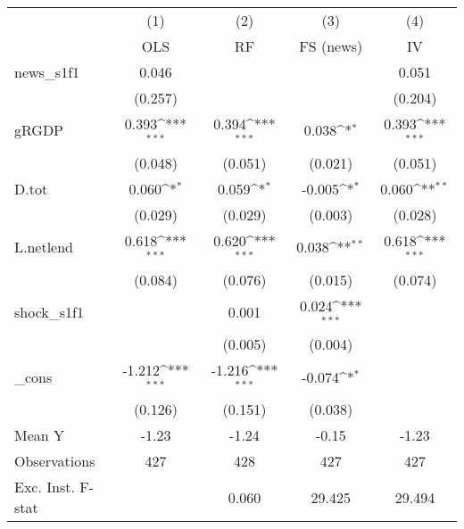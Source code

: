 {
\def\sym#1{\ifmmode^{#1}\else\(^{#1}\)\fi}
\begin{tabular}{l*{4}{c}}
\toprule
            &\multicolumn{1}{c}{(1)}&\multicolumn{1}{c}{(2)}&\multicolumn{1}{c}{(3)}&\multicolumn{1}{c}{(4)}\\
            &\multicolumn{1}{c}{OLS}&\multicolumn{1}{c}{RF}&\multicolumn{1}{c}{FS (news)}&\multicolumn{1}{c}{IV}\\
\midrule
news\_s1f1   &       0.046         &                     &                     &       0.051         \\
            &     (0.257)         &                     &                     &     (0.204)         \\
\addlinespace
gRGDP       &       0.393\sym{***}&       0.394\sym{***}&       0.038\sym{*}  &       0.393\sym{***}\\
            &     (0.048)         &     (0.051)         &     (0.021)         &     (0.051)         \\
\addlinespace
D.tot       &       0.060\sym{*}  &       0.059\sym{*}  &      -0.005\sym{*}  &       0.060\sym{**} \\
            &     (0.029)         &     (0.029)         &     (0.003)         &     (0.028)         \\
\addlinespace
L.netlend   &       0.618\sym{***}&       0.620\sym{***}&       0.038\sym{**} &       0.618\sym{***}\\
            &     (0.084)         &     (0.076)         &     (0.015)         &     (0.074)         \\
\addlinespace
shock\_s1f1  &                     &       0.001         &       0.024\sym{***}&                     \\
            &                     &     (0.005)         &     (0.004)         &                     \\
\addlinespace
\_cons      &      -1.212\sym{***}&      -1.216\sym{***}&      -0.074\sym{*}  &                     \\
            &     (0.126)         &     (0.151)         &     (0.038)         &                     \\
\midrule
Mean Y      &       -1.23         &       -1.24         &       -0.15         &       -1.23         \\
Observations&         427         &         428         &         427         &         427         \\
Exc. Inst. F-stat&                     &       0.060         &      29.425         &      29.494         \\
\bottomrule
\end{tabular}
}
